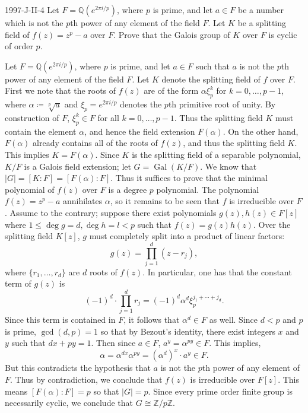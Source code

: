 \documentclass{article}
\begin{document}
	\begin{prb}{1997-J-II-4}
		Let $F = \mathbb{Q}(e^{2\pi i/p})$, where $p$ is prime, and let $a \in F$ be a number which is not the $p$th power of any element of the field $F$. Let $K$ be a splitting field of $f(z) = z^{p} - a$ over $F$. Prove that the Galois group of $K$ over $F$ is cyclic of order $p$. 
	\end{prb}
	Let $F = \mathbb{Q}(e^{2\pi i/p})$, where $p$ is prime, and let $a \in F$ such that $a$ is not the $p$th power of any element of the field $F$. Let $K$ denote the splitting field of $f$ over $F$. First we note that the roots of $f(z)$ are of the form $\alpha \xi_{p}^{k}$ for $k = 0, \ldots, p -1$, where $\alpha \coloneqq \sqrt[p]{a}$ and $\xi_{p}=e^{2\pi i/p}$ denotes the $p$th primitive root of unity. By construction of $F$, $\xi_{p}^{k} \in F$ for all $k = 0, \ldots, p -1$. Thus the splitting field $K$ must contain the element $\alpha$, and hence the field extension $F(\alpha)$. On the other hand, $F(\alpha)$ already contains all of the roots of $f(z)$, and thus the splitting field $K$. This implies $K = F(\alpha)$. Since $K$ is the splitting field of a separable polynomial, $K/F$ is a Galois field extension; let $G =\operatorname{Gal}(K/F)$. We know that $|G| = [K: F] = [F(\alpha): F]$. Thus it suffices to prove that the minimal polynomial of $f(z)$ over $F$ is a degree $p$ polynomial. The polynomial $f(z) = z^{p} - a$ annihilates $\alpha$, so it remains to be seen that $f$ is irreducible over $F$. Assume to the contrary; suppose there exist polynomials $g(z), h(z) \in F[z]$ where $1 \leq  \deg{g} = d, \deg{h} = l < p$ such that $f(z) = g(z)h(z)$. Over the splitting field $K[z]$, $g$ must completely split into a product of linear factors: 
	\begin{equation*}
		g(z) = \prod_{j = 1}^{d}(z - r_{j}), 
	\end{equation*}
	where $\{r_{1}, \ldots, r_{d}\}$ are $d$ roots of $f(z)$. In particular, one has that the constant term of $g(z)$ is 
	\begin{equation*}
		(-1)^{d}\cdot \prod_{j = 1}^{d}r_{j} = (-1)^{d}\alpha^{d}\xi_{p}^{j_{1} + \dotsm + j_{d}}.
	\end{equation*}
	Since this term is contained in $F$, it follows that $\alpha^{d} \in F$ as well. Since $d < p$ and $p$ is prime, $\gcd(d, p) = 1$ so that by Bezout's identity, there exist integers $x$ and $y$ such that $dx + py = 1$. Then since $a \in F$, $a^{y} = \alpha^{py} \in F$. This implies, 
	\begin{equation*}
		\alpha = \alpha^{dx}\alpha^{py} = (\alpha^{d})^{x}\cdot a^{y} \in F. 
	\end{equation*}
	But this contradicts the hypothesis that $a$ is not the $p$th power of any element of $F$. Thus by contradiction, we conclude that $f(z)$ is irreducible over $F[z]$. This means $[F(\alpha):F] = p$ so that $|G| = p$. Since every prime order finite group is necessarily cyclic, we conclude that $G \cong \mathbb{Z}/p\mathbb{Z}$. 
\end{document}
